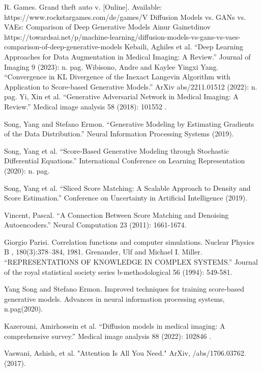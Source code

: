 \documentclass[preprint,12pt,authoryear]{elsarticle}
\begin{document}
\begin{thebibliography}{00}
R. Games. Grand theft auto v. [Online]. Available: https://www.rockstargames.com/de/games/V
Diffusion Models vs. GANs vs. VAEs: Comparison of Deep Generative Models Ainur Gainetdinov https://towardsai.net/p/machine-learning/diffusion-models-vs-gans-vs-vaes-comparison-of-deep-generative-models
Kebaili, Aghiles et al. “Deep Learning Approaches for Data Augmentation in Medical Imaging: A Review.” Journal of Imaging 9 (2023): n. pag.
Wibisono, Andre and Kaylee Yingxi Yang. “Convergence in KL Divergence of the Inexact Langevin Algorithm with Application to Score-based Generative Models.” ArXiv abs/2211.01512 (2022): n. pag.
Yi, Xin et al. “Generative Adversarial Network in Medical Imaging: A Review.” Medical image analysis 58 (2018): 101552 .

 Song, Yang and Stefano Ermon. “Generative Modeling by Estimating Gradients of the Data Distribution.” Neural Information Processing Systems (2019).

Song, Yang et al. “Score-Based Generative Modeling through Stochastic Differential Equations.” International Conference on Learning Representation (2020): n. pag.

Song, Yang et al. “Sliced Score Matching: A Scalable Approach to Density and Score Estimation.” Conference on Uncertainty in Artificial Intelligence (2019).

Vincent, Pascal. “A Connection Between Score Matching and Denoising Autoencoders.” Neural Computation 23 (2011): 1661-1674.

Giorgio Parisi. Correlation functions and computer simulations. Nuclear Physics B , 180(3):378–384, 1981.
Grenander, Ulf and Michael I. Miller. “REPRESENTATIONS OF KNOWLEDGE IN COMPLEX SYSTEMS.” Journal of the royal statistical society series b-methodological 56 (1994): 549-581.

Yang Song and Stefano Ermon. Improved techniques for training score-based generative models. Advances in neural
information processing systems, n.pag(2020).

Kazerouni, Amirhossein et al. “Diffusion models in medical imaging: A comprehensive survey.” Medical image analysis 88 (2022): 102846 .

 Vaswani, Ashish, et al. "Attention Is All You Need." ArXiv, /abs/1706.03762. (2017).



\end{thebibliography}
\end{document}
